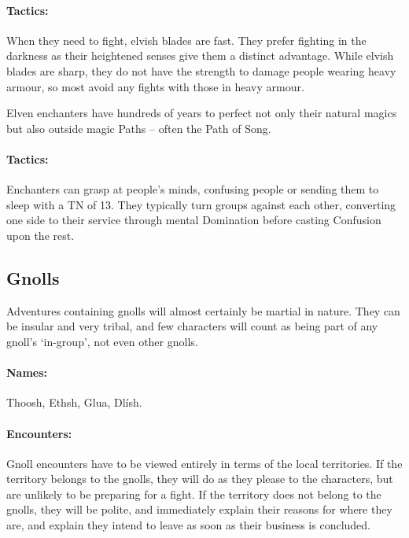 \begin{multicols}{2}
\paragraph{Tactics:} When they need to fight, elvish blades are fast.
They prefer fighting in the darkness as their heightened senses give them a distinct advantage.
While elvish blades are sharp, they do not have the strength to damage people wearing heavy armour, so most avoid any fights with those in heavy armour.


\label{elven_enchanter}

Elven enchanters have hundreds of years to perfect not only their natural magics but also outside magic Paths -- often the Path of Song.


\paragraph{Tactics:} Enchanters can grasp at people's minds, confusing people or sending them to sleep with a TN of 13.
They typically turn groups against each other, converting one side to their service through mental Domination before casting Confusion upon the rest.

\subsection{Gnolls}

\label{gnoll_hunter}

Adventures containing gnolls will almost certainly be martial in nature.  They can be insular and very tribal, and few characters will count as being part of any gnoll's `in-group', not even other gnolls.

\paragraph{Names:} Thoosh, Ethsh, Glua, Dl\'{i}sh.


\paragraph{Encounters:} Gnoll encounters have to be viewed entirely in terms of the local territories.
If the territory belongs to the gnolls, they will do as they please to the characters, but are unlikely to be preparing for a fight.
If the territory does not belong to the gnolls, they will be polite, and immediately explain their reasons for where they are, and explain they intend to leave as soon as their business is concluded.

\end{multicols}
